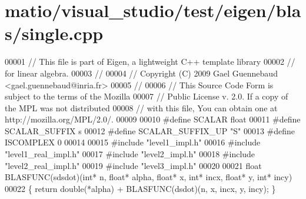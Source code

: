 \hypertarget{matio_2visual__studio_2test_2eigen_2blas_2single_8cpp_source}{}\section{matio/visual\+\_\+studio/test/eigen/blas/single.cpp}
\label{matio_2visual__studio_2test_2eigen_2blas_2single_8cpp_source}

\begin{DoxyCode}
00001 \textcolor{comment}{// This file is part of Eigen, a lightweight C++ template library}
00002 \textcolor{comment}{// for linear algebra.}
00003 \textcolor{comment}{//}
00004 \textcolor{comment}{// Copyright (C) 2009 Gael Guennebaud <gael.guennebaud@inria.fr>}
00005 \textcolor{comment}{//}
00006 \textcolor{comment}{// This Source Code Form is subject to the terms of the Mozilla}
00007 \textcolor{comment}{// Public License v. 2.0. If a copy of the MPL was not distributed}
00008 \textcolor{comment}{// with this file, You can obtain one at http://mozilla.org/MPL/2.0/.}
00009 
00010 \textcolor{preprocessor}{#define SCALAR        float}
00011 \textcolor{preprocessor}{#define SCALAR\_SUFFIX s}
00012 \textcolor{preprocessor}{#define SCALAR\_SUFFIX\_UP "S"}
00013 \textcolor{preprocessor}{#define ISCOMPLEX     0}
00014 
00015 \textcolor{preprocessor}{#include "level1\_impl.h"}
00016 \textcolor{preprocessor}{#include "level1\_real\_impl.h"}
00017 \textcolor{preprocessor}{#include "level2\_impl.h"}
00018 \textcolor{preprocessor}{#include "level2\_real\_impl.h"}
00019 \textcolor{preprocessor}{#include "level3\_impl.h"}
00020 
00021 \textcolor{keywordtype}{float} BLASFUNC(sdsdot)(\textcolor{keywordtype}{int}* n, \textcolor{keywordtype}{float}* alpha, \textcolor{keywordtype}{float}* x, \textcolor{keywordtype}{int}* incx, \textcolor{keywordtype}{float}* y, \textcolor{keywordtype}{int}* incy)
00022 \{ \textcolor{keywordflow}{return} double(*alpha) + BLASFUNC(dsdot)(n, x, incx, y, incy); \}
\end{DoxyCode}
